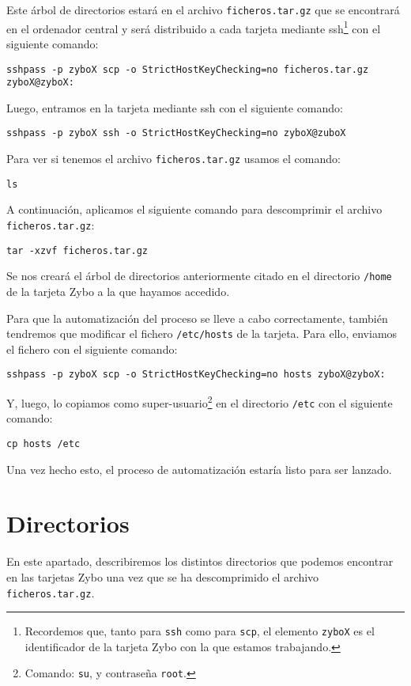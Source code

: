 \documentclass[12pt,letterpaper]{article}
\begin{document}
Este árbol de directorios estará en el archivo \texttt{ficheros.tar.gz} que se encontrará en el ordenador central y será distribuido a cada tarjeta mediante ssh\footnote{Recordemos que, tanto para \texttt{ssh} como para \texttt{scp}, el elemento \texttt{zyboX} es el identificador de la tarjeta Zybo con la que estamos trabajando.} con el siguiente comando:
\begin{center}
	\texttt{sshpass -p zyboX scp -o StrictHostKeyChecking=no ficheros.tar.gz zyboX@zyboX:}
\end{center}

Luego, entramos en la tarjeta mediante ssh con el siguiente comando:
\begin{center}
	\texttt{sshpass -p zyboX ssh -o StrictHostKeyChecking=no zyboX@zuboX}
\end{center}

Para ver si tenemos el archivo \texttt{ficheros.tar.gz} usamos el comando:
\begin{center}
	\texttt{ls}
\end{center}

A continuación, aplicamos el siguiente comando para descomprimir el archivo\\ \texttt{ficheros.tar.gz}:
\begin{center}
	\texttt{tar -xzvf ficheros.tar.gz}
\end{center}

Se nos creará el árbol de directorios anteriormente citado en el directorio \texttt{/home} de la tarjeta Zybo a la que hayamos accedido.

Para que la automatización del proceso se lleve a cabo correctamente, también tendremos que modificar el fichero \texttt{/etc/hosts} de la tarjeta. Para ello, enviamos el fichero con el siguiente comando:
\begin{center}
	\texttt{sshpass -p zyboX scp -o StrictHostKeyChecking=no hosts zyboX@zyboX:}
\end{center}

Y, luego, lo copiamos como super-usuario\footnote{Comando: \texttt{su}, y contraseña \texttt{root}.} en el directorio \texttt{/etc} con el siguiente comando:
\begin{center}
	\texttt{cp hosts /etc}
\end{center}

Una vez hecho esto, el proceso de automatización estaría listo para ser lanzado.

\section{Directorios}
En este apartado, describiremos los distintos directorios que podemos encontrar en las tarjetas Zybo una vez que se ha descomprimido el archivo \texttt{ficheros.tar.gz}.
\end{document}
